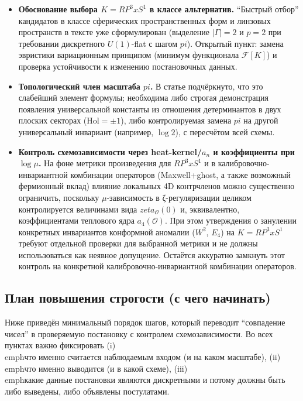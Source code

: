 \documentclass[12pt]{article}
\def\mathbb#1{#1}%
\def\pi{pi}%
\def\times{x}%
\def\zeta{zeta}%
\begin{document}
\begin{itemize}
  \item \textbf{Обоснование выбора $K=\mathbb{RP}^3\times S^1$ в классе альтернатив.}
  ``Быстрый отбор'' кандидатов в классе сферических пространственных форм и линзовых пространств в тексте уже сформулирован (выделение $|\Gamma|=2$ и $p=2$ при требовании дискретного $U(1)$-flat с шагом $\pi$).
  Открытый пункт: замена эвристики вариационным принципом (минимум функционала $\mathcal{F}[K]$) и проверка устойчивости к изменению постановочных данных.

  \item \textbf{Топологический член масштаба $\pi$.}
  В статье подчёркнуто, что это слабейший элемент формулы; необходима либо строгая демонстрация появления универсальной константы из отношения детерминантов в двух плоских секторах ($\mathrm{Hol}=\pm 1$), либо контролируемая замена $\pi$ на другой универсальный инвариант (например, $\log 2$), с пересчётом всей схемы.

  \item \textbf{Контроль схемозависимости через heat-kernel/$a_n$ и коэффициенты при $\log\mu$.}
  На фоне метрики произведения для $\mathbb{RP}^3\times S^1$ и в калибровочно-инвариантной комбинации операторов (Maxwell+ghost, а также возможный фермионный вклад) влияние локальных 4D контрчленов можно существенно ограничить, поскольку $\mu$-зависимость в ζ-регуляризации целиком контролируется величинами вида $\zeta_{\mathcal{O}}(0)$ и, эквивалентно, коэффициентами теплового ядра $a_4(\mathcal{O})$.
  При этом утверждения о занулении конкретных инвариантов конформной аномалии ($W^2$, $E_4$) на $K=\mathbb{RP}^3\times S^1$ требуют отдельной проверки для выбранной метрики и не должны использоваться как неявное допущение.
  Остаётся аккуратно замкнуть этот контроль на конкретной калибровочно-инвариантной комбинации операторов.
\end{itemize}

\subsection{План повышения строгости (с чего начинать)}
Ниже приведён минимальный порядок шагов, который переводит ``совпадение чисел'' в проверяемую постановку с контролем схемозависимости.
Во всех пунктах важно фиксировать 
(i) \\emph{что именно считается наблюдаемым входом} (и на каком масштабе),
(ii) \\emph{что именно выводится} (и в какой схеме),
(iii) \\emph{какие данные постановки являются дискретными} и потому должны быть либо выведены, либо объявлены постулатами.
\end{document}
